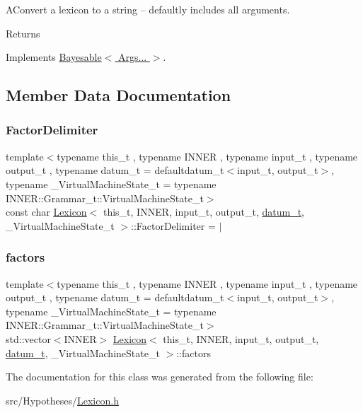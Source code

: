 A\+Convert a lexicon to a string -- defaultly includes all arguments. \begin{DoxyReturn}{Returns}

\end{DoxyReturn}


Implements \hyperlink{class_bayesable_ab6944b4bfe5620c96048287a51d019c1}{Bayesable$<$ Args... $>$}.



\subsection{Member Data Documentation}
\mbox{\label{class_lexicon_abf0f7108f95fdb5d3d66a9bc88a8d04d}} 
\subsubsection{\texorpdfstring{Factor\+Delimiter}{FactorDelimiter}}
{\footnotesize\ttfamily template$<$typename this\+\_\+t , typename I\+N\+N\+ER , typename input\+\_\+t , typename output\+\_\+t , typename datum\+\_\+t  = defaultdatum\+\_\+t$<$input\+\_\+t, output\+\_\+t$>$, typename \+\_\+\+Virtual\+Machine\+State\+\_\+t  = typename I\+N\+N\+E\+R\+::\+Grammar\+\_\+t\+::\+Virtual\+Machine\+State\+\_\+t$>$ \\
const char \hyperlink{class_lexicon}{Lexicon}$<$ this\+\_\+t, I\+N\+N\+ER, input\+\_\+t, output\+\_\+t, \hyperlink{class_bayesable_a9f1a6c0cd7855550fa10b1a8f13a5867}{datum\+\_\+t}, \+\_\+\+Virtual\+Machine\+State\+\_\+t $>$\+::Factor\+Delimiter = \textquotesingle{}$\vert$\textquotesingle{}\hspace{0.3cm}{\ttfamily [static]}}

\mbox{\label{class_lexicon_ac502a88f9e4e38c18c74fa8d039cfe1e}} 
\subsubsection{\texorpdfstring{factors}{factors}}
{\footnotesize\ttfamily template$<$typename this\+\_\+t , typename I\+N\+N\+ER , typename input\+\_\+t , typename output\+\_\+t , typename datum\+\_\+t  = defaultdatum\+\_\+t$<$input\+\_\+t, output\+\_\+t$>$, typename \+\_\+\+Virtual\+Machine\+State\+\_\+t  = typename I\+N\+N\+E\+R\+::\+Grammar\+\_\+t\+::\+Virtual\+Machine\+State\+\_\+t$>$ \\
std\+::vector$<$I\+N\+N\+ER$>$ \hyperlink{class_lexicon}{Lexicon}$<$ this\+\_\+t, I\+N\+N\+ER, input\+\_\+t, output\+\_\+t, \hyperlink{class_bayesable_a9f1a6c0cd7855550fa10b1a8f13a5867}{datum\+\_\+t}, \+\_\+\+Virtual\+Machine\+State\+\_\+t $>$\+::factors}



The documentation for this class was generated from the following file\+:\begin{DoxyCompactItemize}
\item 
src/\+Hypotheses/\hyperlink{_lexicon_8h}{Lexicon.\+h}\end{DoxyCompactItemize}
